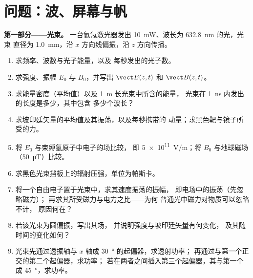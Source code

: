 \section{问题：波、屏幕与帆}

\begin{problem}
\label{pb:b2:plane-waves-polarization:1}

\medskip
\noindent\textbf{第一部分——光束。}
一台氦氖激光器发出 \qty{10}{mW}、波长为 \qty{632.8}{nm} 的光，光束
直径为 \qty{1.0}{mm}，沿 $x$ 方向线偏振，沿
$z$ 方向传播。
\begin{enumerate}
  \item 求频率、波数与光子能量，以及
        每秒发出的光子数。
  \item 求强度、振幅 $E_0$ 与 $B_0$，并写出 $\vect E(z, t)$ 和
        $\vect B(z, t)$。
  \item 求能量密度（平均值）以及 \qty{1}{m} 长光束中所含的能量，
        光束在 \qty{1}{ns} 内发出的长度是多少，其中包含
        多少个波长？
  \item 求坡印廷矢量的平均值及其振荡，以及每秒携带的
        动量；求黑色靶与镜子所受的力。
  \item 将 $E_0$ 与束缚氢原子中电子的场比较，
        即 \qty{5e11}{V/m}；将 $B_0$ 与地球磁场
        （\qty{50}{\micro T}）比较。
  \item 求黑色光束挡板上的辐射压强，单位为帕斯卡。
  \item 将一个自由电子置于光束中，求其速度振荡的振幅，
        即电场中的振荡（先忽略磁力）；
        再求其所受磁力与电力之比——为何
        普通光中磁力对物质可以忽略不计，
        原因何在？
  \item 若该光束为圆偏振，写出其场，
        并说明强度与坡印廷矢量有何变化，
        及其随时间的变化如何？
  \item 光束先通过透振轴与 $x$ 轴成
        \qty{30}{\degree} 的起偏器，求透射功率；
        再通过与第一个正交的第二个起偏器，求功率；
        若在两者之间插入第三个起偏器，其与第一个成 \qty{45}{\degree}，求功率。
\end{enumerate}


\end{problem}
